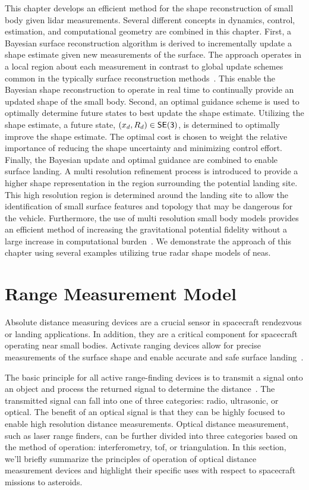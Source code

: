 This chapter develops an efficient method for the shape reconstruction of small body given \gls{lidar} measurements.
Several different concepts in dynamics, control, estimation, and computational geometry are combined in this chapter.
First, a Bayesian surface reconstruction algorithm is derived to incrementally update a shape estimate given new measurements of the surface.
The approach operates in a local region about each measurement in contrast to global update schemes common in the typically surface reconstruction methods~\cite{dey2006}.
This enable the Bayesian shape reconstruction to operate in real time to continually provide an updated shape of the small body.
Second, an optimal guidance scheme is used to optimally determine future states to best update the shape estimate. 
Utilizing the shape estimate, a future state, \( \left( x_d, R_d \right) \in \mathsf{SE(3)} \), is determined to optimally improve the shape estimate. 
The optimal cost is chosen to weight the relative importance of reducing the shape uncertainty and minimizing control effort.
Finally, the Bayesian update and optimal guidance are combined to enable surface landing.
A multi resolution refinement process is introduced to provide a higher shape representation in the region surrounding the potential landing site.
This high resolution region is determined around the landing site to allow the identification of small surface features and topology that may be dangerous for the vehicle. 
Furthermore, the use of multi resolution small body models provides an efficient method of increasing the gravitational potential fidelity without a large increase in computational burden~\cite{mcmahon2017}.
We demonstrate the approach of this chapter using several examples utilizing true radar shape models of \glspl{nea}.

\section{Range Measurement Model}

Absolute distance measuring devices are a crucial sensor in spacecraft rendezvous or landing applications.
In addition, they are a critical component for spacecraft operating near small bodies.
Activate ranging devices allow for precise measurements of the surface shape and enable accurate and safe surface landing~\cite{berry2013}.

The basic principle for all active range-finding devices is to transmit a signal onto an object and process the returned signal to determine the distance~\cite{amann2001}.
The transmitted signal can fall into one of three categories: radio, ultrasonic, or optical.
The benefit of an optical signal is that they can be highly focused to enable high resolution distance measurements.
Optical distance measurement, such as laser range finders, can be further divided into three categories based on the method of operation: interferometry, \gls{tof}, or triangulation.
In this section, we'll briefly summarize the principles of operation of optical distance measurement devices and highlight their specific uses with respect to spacecraft missions to asteroids.

